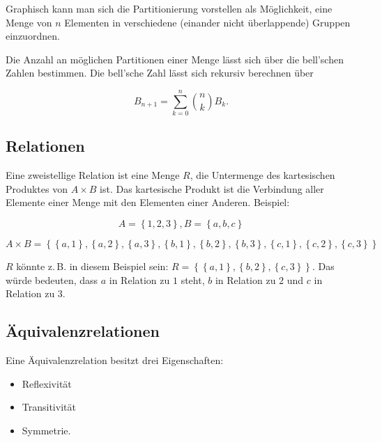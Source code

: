 \documentclass{scrartcl}
\begin{document}
Graphisch kann man sich die Partitionierung vorstellen als Möglichkeit, eine Menge
von $n$ Elementen in verschiedene (einander nicht überlappende) Gruppen einzuordnen.

Die Anzahl an möglichen Partitionen einer Menge lässt sich über die bell'schen Zahlen bestimmen. Die bell'sche Zahl lässt sich rekursiv berechnen über

\begin{equation}
	B_{n + 1} = \sum_{k = 0}^n \binom{n}{k} B_k.
\end{equation}


\subsection{Relationen}

Eine zweistellige Relation ist eine Menge $R$, die Untermenge des 
kartesischen Produktes von 
$A \times B$ ist. Das kartesische Produkt ist die Verbindung aller Elemente einer 
Menge mit den Elementen einer Anderen. Beispiel:

\begin{equation}
	A = \left\{1, 2, 3\right\}, B = \left\{a, b, c\right\}
\end{equation}

\begin{equation}
	A \times B = \left\{
		\left\{a, 1\right\}, \left\{a, 2\right\}, \left\{a, 3\right\},
		\left\{b, 1\right\}, \left\{b, 2\right\}, \left\{b, 3\right\},
		\left\{c, 1\right\}, \left\{c, 2\right\}, \left\{c, 3\right\}
	\right\}
\end{equation}

$R$ könnte z.\,B. in diesem Beispiel sein: $R = \left\{
	\left\{a, 1\right\}, \left\{b, 2\right\}, \left\{c, 3\right\}
\right\}$. Das würde bedeuten, dass $a$ in Relation zu $1$ steht, $b$ in Relation zu
$2$ und $c$ in Relation zu $3$.

\subsection{Äquivalenzrelationen}

Eine Äquivalenzrelation besitzt drei Eigenschaften:

\begin{itemize}
	\item Reflexivität
	\item Transitivität
	\item Symmetrie.
\end{itemize}
\end{document}
